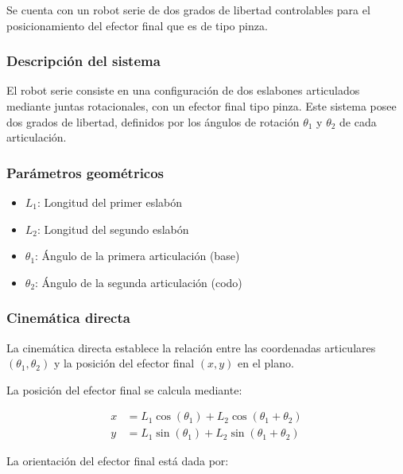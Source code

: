 Se cuenta con un robot serie de dos grados de libertad controlables para el posicionamiento del efector final que es de tipo pinza.

\subsubsection{Descripción del sistema}
\label{sec:desc_brazo}

El robot serie consiste en una configuración de dos eslabones articulados mediante juntas rotacionales, con un efector final tipo pinza. Este sistema posee dos grados de libertad, definidos por los ángulos de rotación $\theta_1$ y $\theta_2$ de cada articulación.

\subsubsection{Parámetros geométricos}
\label{sec:Param_brazo}

\begin{itemize}[label=$\bullet$]
    \item $L_1$: Longitud del primer eslabón
    \item $L_2$: Longitud del segundo eslabón
    \item $\theta_1$: Ángulo de la primera articulación (base)
    \item $\theta_2$: Ángulo de la segunda articulación (codo)
\end{itemize}

\subsubsection{Cinemática directa}

La cinemática directa establece la relación entre las coordenadas articulares $(\theta_1, \theta_2)$ y la posición del efector final $(x, y)$ en el plano.

La posición del efector final se calcula mediante:

\begin{align}
    x &= L_1 \cos(\theta_1) + L_2 \cos(\theta_1 + \theta_2) \label{eq:x_cin_dir}\\
    y &= L_1 \sin(\theta_1) + L_2 \sin(\theta_1 + \theta_2) \label{eq:y_cin_dir}
\end{align}

La orientación del efector final está dada por:

